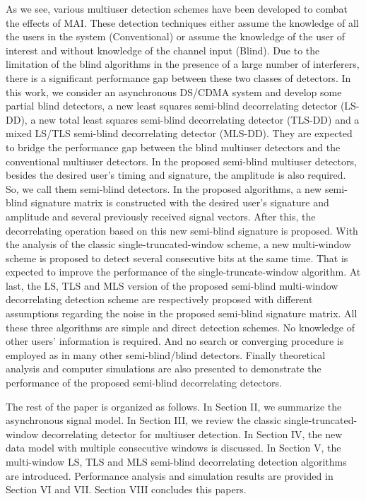 \documentclass[a4paper,11pt,fleqn]{article}
\begin{document}
As we see, various multiuser detection schemes have been developed
to combat the effects of MAI. These detection techniques either
assume the knowledge of all the users in the system (Conventional)
or assume the knowledge of the user of interest and without
knowledge of the channel input (Blind). Due to the limitation of
the blind algorithms in the presence of a large number of
interferers, there is a significant performance gap between these
two classes of detectors. In this work, we consider an
asynchronous DS/CDMA system and develop some partial blind
detectors, a new least squares semi-blind decorrelating detector
(LS-DD), a new total least squares semi-blind decorrelating
detector (TLS-DD) and a mixed LS/TLS semi-blind decorrelating
detector (MLS-DD). They are expected to bridge the performance gap
between the blind multiuser detectors and the conventional
multiuser detectors. In the proposed semi-blind multiuser
detectors, besides the desired user's timing and signature, the
amplitude is also required. So, we call them semi-blind detectors.
In the proposed algorithms, a new semi-blind signature matrix is
constructed with the desired user's signature and amplitude and
several previously received signal vectors. After this, the
decorrelating operation based on this new semi-blind signature is
proposed. With the analysis of the classic single-truncated-window
scheme, a new multi-window scheme is proposed to detect several
consecutive bits at the same time. That is expected to improve the
performance of the single-truncate-window algorithm. At last, the
LS, TLS and MLS version of the proposed semi-blind multi-window
decorrelating detection scheme are respectively proposed with
different assumptions regarding the noise in the proposed
semi-blind signature matrix. All these three algorithms are simple
and direct detection schemes. No knowledge of other users'
information is required. And no search or converging procedure is
employed as in many other semi-blind/blind detectors. Finally
theoretical analysis and computer simulations are also presented
to demonstrate the performance of the proposed semi-blind
decorrelating detectors.

The rest of the paper is organized as follows. In Section II, we
summarize the asynchronous signal model. In Section III, we review
the classic single-truncated-window decorrelating detector for
multiuser detection. In Section IV, the new data model with
multiple consecutive windows is discussed. In Section V, the
multi-window LS, TLS and MLS semi-blind decorrelating detection
algorithms are introduced. Performance analysis and simulation
results are provided in Section VI and VII. Section VIII concludes
this papers.
\end{document}
